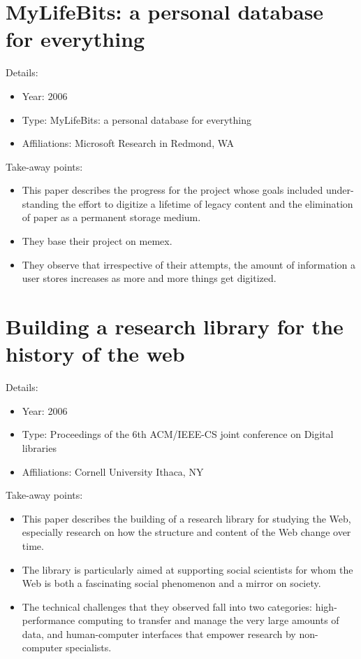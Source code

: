 \documentclass[12pt, onecolumn]{IEEEtran}
\begin{document}
\section{MyLifeBits: a personal database for everything \cite{Gemmell:2006:MPD}}
\noindent Details:
\begin{itemize}
  \item Year: 2006
  \item Type: MyLifeBits: a personal database for everything
  \item Affiliations: Microsoft Research in Redmond, WA
\end{itemize}
\medskip
Take-away points:
\begin{itemize}
  \item This paper describes the progress for the project whose goals included under- standing the effort to digitize a lifetime of legacy content and the elimination of paper as a permanent storage medium. 
  \item They base their project on memex.
  \item They observe that irrespective of their attempts, the amount of information a user stores increases as more and more things get digitized.
\end{itemize}
\bigskip\bigskip

\section{Building a research library for the history of the web \cite{Arms:2006:BRL}}
\noindent Details:
\begin{itemize}
  \item Year: 2006
  \item Type: Proceedings of the 6th ACM/IEEE-CS joint conference on Digital libraries
  \item Affiliations: Cornell University Ithaca, NY
\end{itemize}
\medskip 
Take-away points:
\begin{itemize}
  \item This paper describes the building of a research library for studying the Web, especially research on how the structure and content of the Web change over time.
  \item The library is particularly aimed at supporting social scientists for whom the Web is both a fascinating social phenomenon and a mirror on society.
  \item The technical challenges that they observed fall into two categories: high-performance computing to transfer and manage the very large amounts of data, and human-computer interfaces that empower research by non-computer specialists.


\end{itemize}
\bigskip\bigskip




\end{document}
